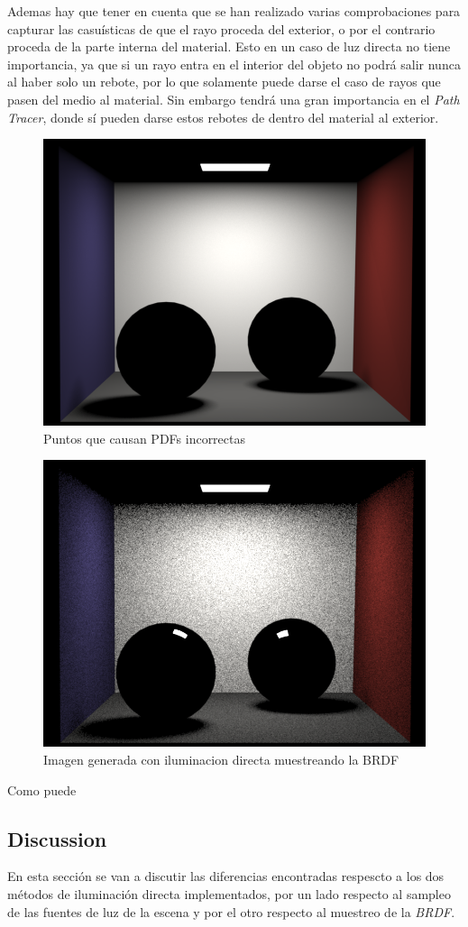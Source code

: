 \documentclass[10pt,oneside,a4paper]{article}
\begin{document}
Ademas hay que tener en cuenta que se han realizado varias comprobaciones para capturar las casuísticas de que el rayo proceda del exterior, o por el contrario proceda de la parte interna del material. Esto en un caso de luz directa no tiene importancia, ya que si un rayo entra en el interior del objeto no podrá salir nunca al haber solo un rebote, por lo que solamente puede darse el caso de rayos que pasen del medio al material. Sin embargo tendrá una gran importancia en el \textit{Path Tracer}, donde sí pueden darse estos rebotes de dentro del material al exterior.
 
 \begin{figure}[h]
\centering
\includegraphics[width=.6\linewidth]{images/cbox_direct_ems_comlex_512.png}
\caption{Puntos que causan PDFs incorrectas}
\label{fig:disp}
\end{figure}

\begin{figure}[h]
\centering
\includegraphics[width=.6\linewidth]{images/cbox_direct_mats_complex_512.png}
\caption{Imagen generada con iluminacion directa muestreando la BRDF}
\label{fig:disp}
\end{figure}

Como puede 
 
 \subsection{Discussion}
 En esta sección se van a discutir las diferencias encontradas respescto a los dos métodos de iluminación directa implementados, por un lado respecto al sampleo de las fuentes de luz de la escena y por el otro respecto al muestreo de la \textit{BRDF}.\\
 
\end{document}
